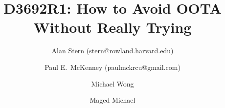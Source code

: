 

\usepackage[T1]{fontenc} %
\usepackage{textcomp} %

\usepackage{microtype}

\usepackage{lscape}
\usepackage{fancyhdr}
\usepackage{subfigure}
\usepackage{url}
\usepackage{graphics}
\usepackage{ifthen}
\usepackage{float}
\usepackage{listings}
\lstset{basicstyle=\ttfamily}



\DeclareUrlCommand\email{}

\pagestyle{plain}



\title{D3692R1: How to Avoid OOTA Without Really Trying}

\newcommand{\co}[1]{\lstinline[breaklines=yes,breakatwhitespace=yes]{#1}}

\author{
Alan Stern (stern@rowland.harvard.edu) \and
Paul E.~McKenney (paulmckrcu@gmail.com) \and
Michael Wong \and
Maged Michael
}

